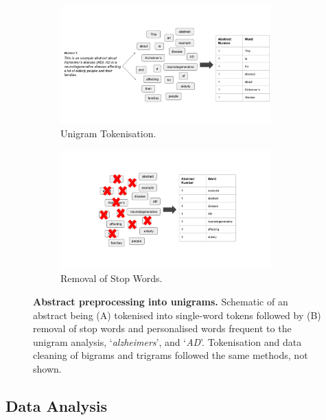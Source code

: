 \documentclass[
  a4paper,
]{article}
\begin{document}
\begin{figure}

{\centering 

\begin{figure}[H]

{\centering \includegraphics[width=3.2in,height=\textheight]{data/preprocess1.png}

}

\caption{Unigram Tokenisation.}

\end{figure}

\begin{figure}[H]

{\centering \includegraphics[width=3.2in,height=\textheight]{data/preprocess2.png}

}

\caption{Removal of Stop Words.}

\end{figure}

}

\caption{\label{fig-preprocess}\textbf{Abstract preprocessing into
unigrams.} Schematic of an abstract being (A) tokenised into single-word
tokens followed by (B) removal of stop words and personalised words
frequent to the unigram analysis, `\emph{alzheimers}', and `\emph{AD}'.
Tokenisation and data cleaning of bigrams and trigrams followed the same
methods, not shown.}

\end{figure}

\hypertarget{data-analysis}{%
\subsection{Data Analysis}\label{data-analysis}}
\end{document}
